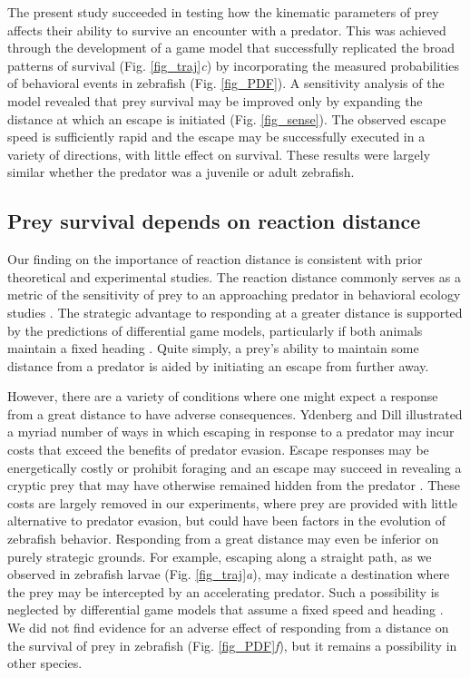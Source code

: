 \documentclass[]{rsos}%
\begin{document}
The present study succeeded in testing how the kinematic parameters of prey affects their ability to survive an encounter with a predator.
This was achieved through the development of a game model that successfully replicated the broad patterns of survival (Fig. \ref{fig_traj}\textit{c}) by incorporating the measured probabilities of behavioral events in zebrafish (Fig. \ref{fig_PDF}).
A sensitivity analysis of the model revealed that prey survival may be improved only by expanding the distance at which an escape is initiated (Fig. \ref{fig_sense}). 
The observed escape speed is sufficiently rapid and the escape may be successfully executed in a variety of directions, with little effect on survival.
These results were largely similar whether the predator was a juvenile or adult zebrafish.


\subsection{Prey survival depends on reaction distance} 

Our finding on the importance of reaction distance is consistent with prior theoretical and experimental studies.
The reaction distance commonly serves as a metric of the sensitivity of prey to an approaching predator in behavioral ecology studies \cite{Cooper:2015vf}.
The strategic advantage to responding at a greater distance is supported by the predictions of differential game models, particularly if both animals maintain a fixed heading \cite{Isaacs:1965uz,Weihs:1984tb,Soto:2015cj}. 
Quite simply, a prey's ability to maintain some distance from a predator is aided by initiating an escape from further away.

However, there are a variety of conditions where one might expect a response from a great distance to have adverse consequences.
Ydenberg and Dill \cite{Ydenberg:1986tm} illustrated a myriad number of ways in which escaping in response to a predator may incur costs that exceed the benefits of predator evasion.
Escape responses may be energetically costly or prohibit foraging and an escape may succeed in revealing a cryptic prey that may have otherwise remained hidden from the predator \cite{Cooper:2015vf,Broom:2005gq}.
These costs are largely removed in our experiments, where prey are provided with little alternative to predator evasion, but could have been factors in the evolution of zebrafish behavior.
Responding from a great distance may even be inferior on purely strategic grounds. 
For example, escaping along a straight path, as we observed in zebrafish larvae (Fig. \ref{fig_traj}\textit{a}), may indicate a destination where the prey may be intercepted by an accelerating predator. 
Such a possibility is neglected by differential game models that assume a fixed speed and heading \cite{Weihs:1984tb, Isaacs:1965uz}.
We did not find evidence for an adverse effect of responding from a distance on the survival of prey in zebrafish (Fig. \ref{fig_PDF}\textit{f}), but it remains a possibility in other species.
\end{document}
